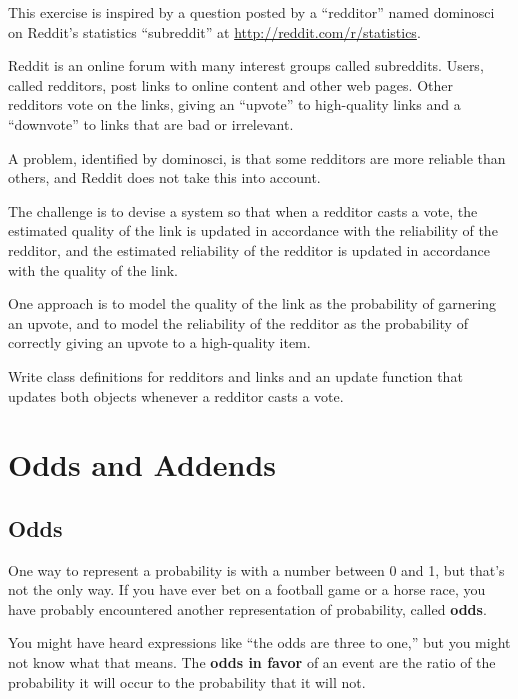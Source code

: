 \documentclass[12pt]{book}
\begin{document}
\begin{exercise}

This exercise is inspired by a question posted by a
``redditor'' named dominosci on Reddit's statistics ``subreddit'' at
\url{http://reddit.com/r/statistics}.

Reddit is an online forum with many interest groups called
subreddits.  Users, called redditors, post links to online
content and other web pages.  Other redditors vote on the links,
giving an ``upvote'' to high-quality links and a ``downvote'' to
links that are bad or irrelevant.

A problem, identified by dominosci, is that some redditors
are more reliable than others, and Reddit does not take
this into account.

The challenge is to devise a system so that when a redditor
casts a vote, the estimated quality of the link is updated
in accordance with the reliability of the redditor, and the
estimated reliability of the redditor is updated in accordance
with the quality of the link.

One approach is to model the quality of the link as the
probability of garnering an upvote, and to model the reliability
of the redditor as the probability of correctly giving an upvote
to a high-quality item.

Write class definitions for redditors and links and an update function
that updates both objects whenever a redditor casts a vote.

\end{exercise}



\chapter{Odds and Addends}

\section{Odds}

One way to represent a probability is with a number between
0 and 1, but that's not the only way.  If you have ever bet
on a football game or a horse race, you have probably encountered
another representation of probability, called {\bf odds}.

You might have heard expressions like ``the odds are
three to one,'' but you might not know what that means.  
The {\bf odds in favor} of an event are the ratio of the probability
it will occur to the probability that it will not.
\end{document}

